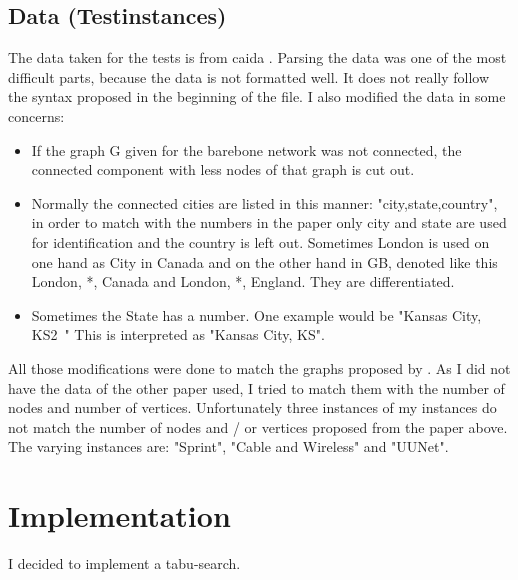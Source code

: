 \documentclass [12pt]{article}
\begin{document}
\subsection{Data (Testinstances)}
The data taken for the tests is from caida \cite{caidabarebones}. Parsing the
data was one of the most difficult parts, because the data is not formatted well.
It does not really follow the syntax proposed in the beginning of the file. I also
modified the data in some concerns:
\begin{itemize}
  \item If the graph G given for the barebone network was not connected,
    the connected component with less nodes of that graph is cut out.

  \item Normally the connected cities are listed in this manner:
    "city,state,country", in order to match with the numbers 
    in the paper \cite{mirrorserver} only city and state are used for
    identification and the country is left out. Sometimes London
    is used on one hand as City in Canada and on the other hand in GB, denoted like this
    London, *, Canada and London, *, England. They are differentiated.
  \item Sometimes the State has a number. One example would be "Kansas City, KS2~"
    This is interpreted as "Kansas City, KS".

\end{itemize}

All those modifications were done to match the graphs proposed by \cite{mirrorserver}.
As I did not have the data of the other paper used, I tried to match them with the number of
nodes and number of vertices. Unfortunately three instances of my instances do not
match the number of nodes and / or vertices proposed from the paper above.
The varying instances are: "Sprint", "Cable and Wireless" and "UUNet".

\section{Implementation}
I decided to implement a tabu-search.
\end{document}

